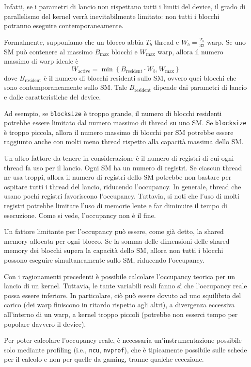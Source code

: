 Infatti, se i parametri di lancio non rispettano tutti i limiti del device, il grado di parallelismo del kernel verrà inevitabilmente limitato: non tutti i blocchi potranno eseguire contemporaneamente.

Formalmente, supponiamo che un blocco abbia \(T_{b}\) thread e \(W_{b} = \frac{T_{b}}{32}\) warp. Se uno SM può contenere al massimo \(B_{\max}\) blocchi e \(W_{\max}\) warp, allora il numero massimo di warp ideale è
\[
W_{\text{active}} = \min \left\{ B_{\text{resident}} \cdot W_{b}, W_{\max} \right\}
\]
dove \(B_{\text{resident}}\) è il numero di blocchi residenti sullo SM, ovvero quei blocchi che sono contemporaneamente sullo SM. Tale \(B_{\text{resident}}\) dipende dai parametri di lancio e dalle caratteristiche del device.

Ad esempio, se \texttt{blocksize} è troppo grande, il numero di blocchi residenti potrebbe essere limitato dal numero massimo di thread su uno SM. 
Se \texttt{blocksize} è troppo piccola, allora il numero massimo di blocchi per SM potrebbe essere raggiunto anche con molti meno thread rispetto alla capacità massima dello SM.

Un altro fattore da tenere in considerazione è il numero di registri di cui ogni thread fa uso per il lancio. 
Ogni SM ha un numero di registri. Se ciascun thread ne usa troppi, allora il numero di registri dello SM potrebbe non bastare per ospitare tutti i thread del lancio, riducendo l'occupancy. 
In generale, thread che usano pochi registri favoriscono l'occupancy. 
Tuttavia, si noti che l'uso di molti registri potrebbe limitare l'uso di memorie lente e far diminuire il tempo di esecuzione. 
Come si vede, l'occupancy non è il fine.

Un fattore limitante per l'occupancy può essere, come già detto, la shared memory allocata per ogni blocco. 
Se la somma delle dimensioni delle shared memory dei blocchi supera la capacità dello SM, allora non tutti i blocchi possono eseguire simultaneamente sullo SM, riducendo l'occupancy.

Con i ragionamenti precedenti è possibile calcolare l'occupancy teorica per un lancio di un kernel. Tuttavia, le tante variabili reali fanno sì che l'occupancy reale possa essere inferiore. 
In particolare, ciò può essere dovuto ad uno squilibrio del carico (dei warp finiscono in ritardo rispetto agli altri), a divergenza eccessiva all'interno di un warp, a kernel troppo piccoli (potrebbe non esserci tempo per popolare davvero il device).

Per poter calcolare l'occupancy reale, è necessaria un'instrumentazione possibile solo mediante profiling (i.e., \texttt{ncu}, \texttt{nvprof}), che è tipicamente possibile sulle schede per il calcolo e non per quelle da gaming, tranne qualche eccezione.

